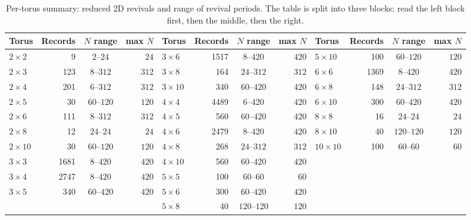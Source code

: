\begin{table}[htbp]
\centering
\caption{Per-torus summary: reduced 2D revivals and range of revival
periods. The table is split into three blocks; read the left block
first, then the middle, then the right.}
\label{tab:tori-summary}
\begin{tabular}{lrcr|lrcr|lrcr}
\toprule
Torus & Records & $N$ range & max $N$
  & Torus & Records & $N$ range & max $N$
  & Torus & Records & $N$ range & max $N$ \\
\midrule
$2\times2$   & 9    & $2$--$24$    & $24$
  & $3\times6$   & 1517 & $8$--$420$   & $420$
  & $5\times10$  & 100  & $60$--$120$  & $120$ \\
$2\times3$   & 123  & $8$--$312$   & $312$
  & $3\times8$   & 164  & $24$--$312$  & $312$
  & $6\times6$   & 1369 & $8$--$420$   & $420$ \\
$2\times4$   & 201  & $6$--$312$   & $312$
  & $3\times10$  & 340  & $60$--$420$  & $420$
  & $6\times8$   & 148  & $24$--$312$  & $312$ \\
$2\times5$   & 30   & $60$--$120$  & $120$
  & $4\times4$   & 4489 & $6$--$420$   & $420$
  & $6\times10$  & 300  & $60$--$420$  & $420$ \\
$2\times6$   & 111  & $8$--$312$   & $312$
  & $4\times5$   & 560  & $60$--$420$  & $420$
  & $8\times8$   & 16   & $24$--$24$   & $24$ \\
$2\times8$   & 12   & $24$--$24$   & $24$
  & $4\times6$   & 2479 & $8$--$420$   & $420$
  & $8\times10$  & 40   & $120$--$120$ & $120$ \\
$2\times10$  & 30   & $60$--$120$  & $120$
  & $4\times8$   & 268  & $24$--$312$  & $312$
  & $10\times10$ & 100  & $60$--$60$   & $60$ \\
$3\times3$   & 1681 & $8$--$420$   & $420$
  & $4\times10$  & 560  & $60$--$420$  & $420$
  &              &      &              &      \\
$3\times4$   & 2747 & $8$--$420$   & $420$
  & $5\times5$   & 100  & $60$--$60$   & $60$
  &              &      &              &      \\
$3\times5$   & 340  & $60$--$420$  & $420$
  & $5\times6$   & 300  & $60$--$420$  & $420$
  &              &      &              &      \\
             &      &              &
  & $5\times8$   & 40   & $120$--$120$ & $120$
  &              &      &              &      \\
\bottomrule
\end{tabular}
\end{table}

